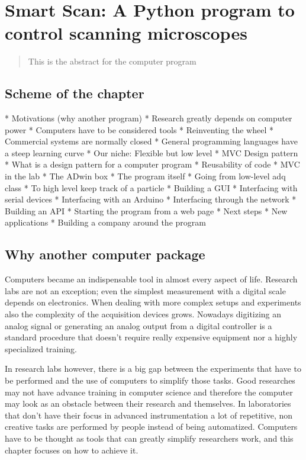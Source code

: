 \chapter[Smart Scan]{Smart Scan: A Python program to control scanning
microscopes}
\label{ch:Damping}

\begin{abstract}
This is the abstract for the computer program
\end{abstract}

\newpage

\section{Scheme of the chapter}
* Motivations (why another program)
  * Research greatly depends on computer power
  * Computers have to be considered tools
  * Reinventing the wheel
  * Commercial systems are normally closed
  * General programming languages have a steep learning curve
  * Our niche: Flexible but low level
* MVC Design pattern
  * What is a design pattern for a computer program
  * Reusability of code
  * MVC in the lab
  * The ADwin box
* The program itself
  * Going from low-level adq class
  * To high level keep track of a particle
  * Building a GUI
  * Interfacing with serial devices
  * Interfacing with an Arduino
  * Interfacing through the network
  * Building an API
  * Starting the program from a web page
* Next steps
  * New applications
  * Building a company around the program


\section{Why another computer package}
Computers became an indispensable tool in almost every aspect of life. Research
labs are not an exception; even the simplest measurement with a digital scale
depends on electronics. When dealing with more complex setups and experiments
also the complexity of the acquisition devices grows. Nowadays digitizing an
analog signal or generating an analog output from a digital controller is a
standard procedure that doesn't require really expensive equipment nor a
highly specialized training. 

In research labs however, there is a big gap between the experiments that have
to be performed and the use of computers to simplify those tasks. Good
researches may not have advance training in computer science and therefore the
computer may look as an obstacle between their research and themselves. In
laboratories that don't have their focus in advanced instrumentation a lot of
repetitive, non creative tasks are performed by people instead of being
automatized. Computers have to be thought as tools that can greatly simplify 
researchers work, and this chapter focuses on how to achieve it. 

